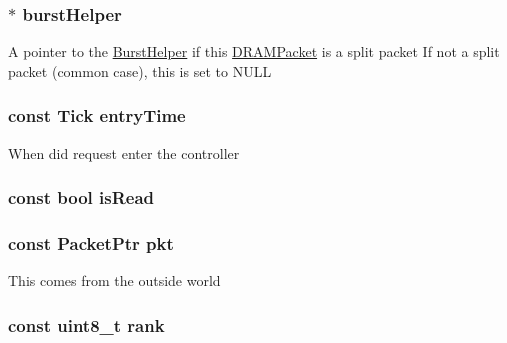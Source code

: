 \label{classDRAMCtrl_1_1DRAMPacket_ad74d737401d318ad6e3449a0826de315}
\hypertarget{classDRAMCtrl_1_1DRAMPacket_ad3b6db2cc317849c6f88f306116e6540}{
\subsubsection[{burstHelper}]{$\ast$ {\bf burstHelper}}}
\label{classDRAMCtrl_1_1DRAMPacket_ad3b6db2cc317849c6f88f306116e6540}
A pointer to the \hyperlink{classDRAMCtrl_1_1BurstHelper}{BurstHelper} if this \hyperlink{classDRAMCtrl_1_1DRAMPacket}{DRAMPacket} is a split packet If not a split packet (common case), this is set to NULL \hypertarget{classDRAMCtrl_1_1DRAMPacket_ab1ccb8a8c8d1a5b1c5f41693f4097e63}{
\subsubsection[{entryTime}]{\setlength{\rightskip}{0pt plus 5cm}const {\bf Tick} {\bf entryTime}}}
\label{classDRAMCtrl_1_1DRAMPacket_ab1ccb8a8c8d1a5b1c5f41693f4097e63}
When did request enter the controller \hypertarget{classDRAMCtrl_1_1DRAMPacket_a932f133d9a9765cb284a8898c11a9c5f}{
\subsubsection[{isRead}]{\setlength{\rightskip}{0pt plus 5cm}const bool {\bf isRead}}}
\label{classDRAMCtrl_1_1DRAMPacket_a932f133d9a9765cb284a8898c11a9c5f}
\hypertarget{classDRAMCtrl_1_1DRAMPacket_a6fb971eb547deb70a1eb9fc09047e9ae}{
\subsubsection[{pkt}]{\setlength{\rightskip}{0pt plus 5cm}const {\bf PacketPtr} {\bf pkt}}}
\label{classDRAMCtrl_1_1DRAMPacket_a6fb971eb547deb70a1eb9fc09047e9ae}
This comes from the outside world \hypertarget{classDRAMCtrl_1_1DRAMPacket_aa939c368630feb349e132c957bf16cc8}{
\subsubsection[{rank}]{\setlength{\rightskip}{0pt plus 5cm}const uint8\_\-t {\bf rank}}}
